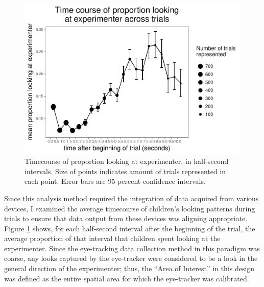 \documentclass[floatsintext,man]{apa6}
\theoremstyle{definition}
\theoremstyle{definition}
\theoremstyle{definition}
\theoremstyle{remark}
\begin{document}
\begin{figure}
\centering
\includegraphics{soc_ref_category_paper_files/figure-latex/forwardtimecourse-1.pdf}
\caption{\label{fig:forwardtimecourse}Timecourse of proportion looking at
experimenter, in half-second intervals. Size of points indicates amount
of trials represented in each point. Error bars are 95 percent
confidence intervals.}
\end{figure}

Since this analysis method required the integration of data acquired
from various devices, I examined the average timecourse of children's
looking patterns during trials to ensure that data output from these
devices was aligning appropriate. Figure \ref{fig:forwardtimecourse}
shows, for each half-second interval after the beginning of the trial,
the average proportion of that interval that children spent looking at
the experimenter. Since the eye-tracking data collection method in this
paradigm was coarse, any looks captured by the eye-tracker were
considered to be a look in the general direction of the experimenter;
thus, the \enquote{Area of Interest} in this design was defined as the
entire spatial area for which the eye-tracker was calibrated.
\end{document}
